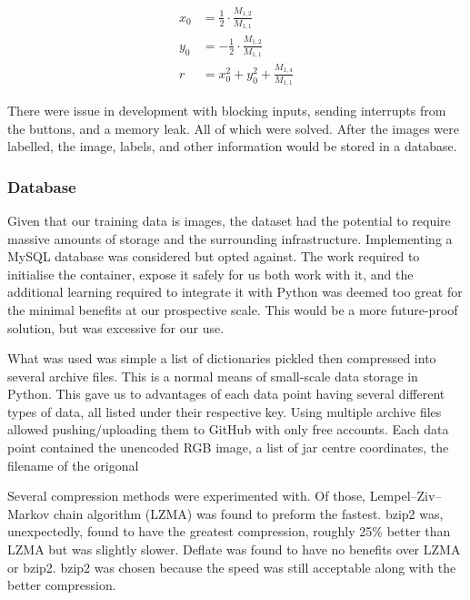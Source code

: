 \documentclass[11pt]{article}
\begin{document}
                \begin{align}
                    x_0 &= \frac{1}{2} \cdot \frac{M_{1,2}}{M_{1,1}} \label{eq:x_0}\\
                    y_0 &= -\frac{1}{2} \cdot \frac{M_{1,2}}{M_{1,1}} \label{eq:y_0}\\
                    r   &= x_0^2 + y_0^2 + \frac{M_{1,4}}{M_{1,1}} \label{eq:r}
                \end{align}

                There were issue in development with blocking inputs, sending interrupts from the buttons, and a memory leak. All of which were solved. After the images were labelled, the image, labels, and other information would be stored in a database.

            \subsubsection{Database}
                Given that our training data is images, the dataset had the potential to require massive amounts of storage and the surrounding infrastructure. Implementing a MySQL database was considered but opted against. The work required to initialise the container, expose it safely for us both work with it, and the additional learning required to integrate it with Python was deemed too great for the minimal benefits at our prospective scale. This would be a more future-proof solution, but was excessive for our use.

                What was used was simple a list of dictionaries pickled then compressed into several archive files. This is a normal means of small-scale data storage in Python. This gave us to advantages of each data point having several different types of data, all listed under their respective key. Using multiple archive files allowed pushing/uploading them to GitHub with only free accounts. Each data point contained the unencoded RGB image, a list of jar centre coordinates, the filename of the origonal
                
                Several compression methods were experimented with. Of those, Lempel–Ziv–Markov chain algorithm (LZMA) was found to preform the fastest. bzip2 was, unexpectedly, found to have the greatest compression, roughly 25\% better than LZMA but was slightly slower. Deflate was found to have no benefits over LZMA or bzip2. bzip2 was chosen because the speed was still acceptable along with the better compression.
\end{document}

